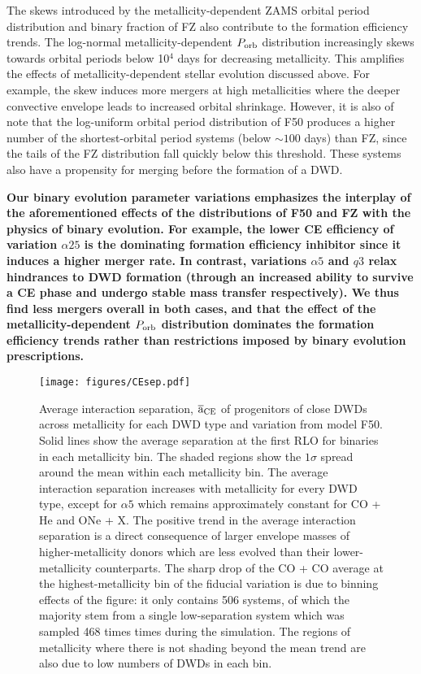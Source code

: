 \documentclass[twocolumn, linenumbers]{aastex631}
\begin{document}
The skews introduced by the metallicity-dependent ZAMS orbital period 
distribution and binary fraction of FZ also contribute to the formation 
efficiency trends. The log-normal metallicity-dependent $P_{\rm{orb}}$ 
distribution increasingly skews towards orbital periods below 10$^4$ days 
for decreasing metallicity. This amplifies the effects of 
metallicity-dependent stellar evolution discussed above. For example, the 
skew induces more mergers at high metallicities where the deeper 
convective envelope leads to increased orbital shrinkage. However, it is 
also of note that the log-uniform orbital period distribution of F50 
produces a higher number of the shortest-orbital period systems (below 
$\sim100$ days) than FZ, since the tails of the FZ distribution fall 
quickly below this threshold. These systems also have a propensity for 
merging before the formation of a DWD. 

\textbf{Our binary evolution parameter variations emphasizes the interplay 
of the aforementioned effects of the distributions of F50 and FZ with the 
physics of binary evolution. For example, the lower CE efficiency of 
variation $\alpha25$ is the dominating formation efficiency inhibitor 
since it induces a higher merger rate. In contrast, variations $\alpha5$ 
and $q3$ relax hindrances to DWD formation (through an increased ability 
to survive a CE phase and undergo stable mass transfer respectively). We 
thus find less mergers overall in both cases, and that the effect of the 
metallicity-dependent $P_{\rm{orb}}$ distribution dominates the formation 
efficiency trends rather than restrictions imposed by binary evolution 
prescriptions.
}


\begin{figure*}
	\texttt{[image: figures/CEsep.pdf]}
    \caption{Average interaction separation, 
$\overline{\mathrm{a}}_{\rm{CE}}$ of progenitors of close DWDs across 
metallicity for each DWD type and variation from model F50. Solid lines 
show the average separation at the first RLO for binaries in each 
metallicity bin. The shaded regions show the $1\sigma$ spread around the 
mean within each metallicity bin. The average interaction separation 
increases with metallicity for every DWD type, except for $\alpha5$ which 
remains approximately constant for CO + He and ONe + X. The positive trend 
in the average interaction separation is a direct consequence of larger 
envelope masses of higher-metallicity donors which are less evolved than 
their lower-metallicity counterparts. The sharp drop of the CO + CO 
average at the highest-metallicity bin of the fiducial variation is due to 
binning effects of the figure: it only contains 506 systems, of which the 
majority stem from a single low-separation system which was sampled 468 
times times during the simulation. The regions of metallicity where there 
is not shading beyond the mean trend are also due to low numbers of DWDs 
in each bin.} 
    \label{fig:CEsep}
\end{figure*}
\end{document}
